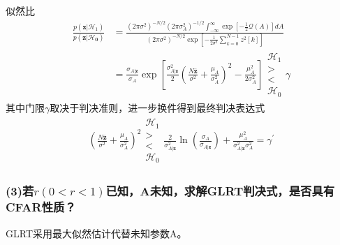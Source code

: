 \documentclass[fontset=windows]{article}
\numberwithin{figure}{section}
\begin{document}
似然比
\begin{align*}
	\frac{p(\mathbf{z}|\mathcal{H}_1)}{p(\mathbf{z|\mathcal{H}_0})}
	 & =\frac{(2\pi \sigma^2)^{-N/2}(2\pi \sigma^2_A)^{-1/2}
	\int_{-\infty}^{\infty}\exp[-\frac{1}{2}\mathcal{Q}(A)]dA}
	{(2\pi \sigma^2)^{-N/2}\exp[-\frac{1}{2\sigma^2}\sum_{k=0}^{N-1}z^2[k]]}              \\
	 & =\frac{\sigma_{A|\mathbf{z}}}{\sigma_A}\exp\left[\frac{\sigma^2_{A|\mathbf{z}}}{2}
	\left(\frac{N\overline{\mathbf{z}}}{\sigma^2}+\frac{\mu_A}{\sigma^2_A}\right)^2-\frac{\mu^2_A}{2\sigma^2_A}\right]
	\begin{matrix}
		\mathcal{H}_1 \\>\\<\\\mathcal{H}_0
	\end{matrix}\gamma
\end{align*}
其中门限\(\gamma\)取决于判决准则，进一步换件得到最终判决表达式
\begin{align*}
	(\frac{N\overline{\mathbf{z}}}{\sigma^2}+\frac{\mu_A}{\sigma^2_A})^2
	\begin{matrix}
		\mathcal{H}_1 \\>\\<\\\mathcal{H}_0
	\end{matrix}
	\frac{2}{\sigma^2_{A|\mathbf{z}}}\ln(\frac{\sigma_A}{\sigma_{A|\mathbf{z}}})+\frac{\mu_A^2}{\sigma^2_{A|\mathbf{z}}\sigma^2_A}
	=\gamma^{\prime}
\end{align*}

\subsubsection*{(3)若\(r(0<r<1)\)已知，A未知，求解GLRT判决式，是否具有CFAR性质？}

GLRT采用最大似然估计代替未知参数A。
\end{document}
